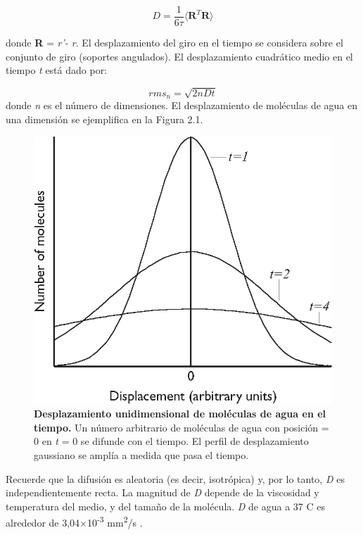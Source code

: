 \documentclass[12pt,a5,twoside]{book}
\begin{document}
\begin{equation}
D = \frac{1}{6 \tau}  \langle \textbf{R}^T\textbf{R} \rangle
\end{equation}

donde \textbf{R} = {\it r'- r}. El desplazamiento del giro en el tiempo se considera sobre el conjunto de giro (soportes angulados). El desplazamiento cuadrático medio en el tiempo {\it t} está dado por:

\begin{equation}
rms_{n} = \sqrt{2nDt}
\end{equation}
donde {\it n} es el número de dimensiones. El desplazamiento de moléculas de agua en una dimensión se ejemplifica en la Figura 2.1. \\

\begin{figure}
	\centering
    \includegraphics [scale=1,center] {gaussianDiffusion.eps}
    \caption{\textbf{Desplazamiento unidimensional de moléculas de agua en el tiempo.} Un número arbitrario de moléculas de agua con posición = 0 en {\it t} = 0 se difunde con el tiempo. El perfil de desplazamiento gaussiano se amplía a medida que pasa el tiempo.}
\end{figure}

Recuerde que la difusión es aleatoria (es decir, isotrópica) y, por lo tanto, {\it D} es independientemente recta. La magnitud de {\it D} depende de la viscosidad y temperatura del medio, y del tamaño de la molécula. {\it D} de agua a 37 \textdegree{}C es alrededor de 3,04×10\textsuperscript{-3} mm\textsuperscript{2}/s \citep{Mills?1973}.
\end{document}
